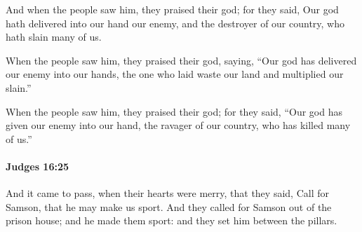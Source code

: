 			\begin{versebox}
					\item[BHS] 
					\item[ASV] And when the people saw him, they praised their god; for they said, Our god hath delivered into our hand our enemy, and the destroyer of our country, who hath slain many of us.
					\item[NIV] When the people saw him, they praised their god, saying, “Our god has delivered our enemy into our hands, the one who laid waste our land and multiplied our slain.”
					\item[NRSV] When the people saw him, they praised their god; for they said, “Our god has given our enemy into our hand, the ravager of our country, who has killed many of us.”
			\end{versebox}

		\paragraph{Judges 16:25} %
			\label{JUDGES-16-25}

			And it came to pass, when their hearts were merry, that they said, Call for Samson, that he may make us sport. And they called for Samson out of the prison house; and he made them sport: and they set him between the pillars.

